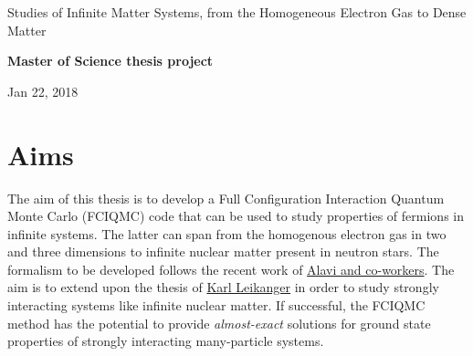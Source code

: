 \documentclass[%
oneside,                 %
final,                   %
10pt]{article}
\begin{document}

\newcommand{\exercisesection}[1]{\subsection*{#1}}






\thispagestyle{empty}

\begin{center}
{\LARGE\bf
\begin{spacing}{1.25}
Studies of Infinite Matter Systems, from the Homogeneous Electron Gas to Dense Matter 
\end{spacing}
}
\end{center}


\begin{center}
{\bf Master of Science thesis project${}^{}$} \\ [0mm]
\end{center}

\begin{center}
\end{center}
    

\begin{center}
Jan 22, 2018
\end{center}

\vspace{1cm}


\section*{Aims}

The aim of this thesis is to develop a Full Configuration Interaction Quantum Monte Carlo (FCIQMC)
code that can be used to study properties of fermions in infinite systems. The latter can span from 
the homogenous electron gas in two and three dimensions to infinite nuclear matter present in neutron stars. 
The formalism to be developed follows the recent work of \href{{http://www.nature.com/nature/journal/v493/n7432/full/nature11770.html}}{Alavi and co-workers}. The aim is to extend upon the thesis of \href{{https://www.duo.uio.no/handle/10852/37172}}{Karl Leikanger} in order to study strongly interacting systems like infinite nuclear matter.  If successful, the FCIQMC method has the potential to provide \emph{almost-exact} solutions for ground state properties of strongly interacting many-particle systems. 
\end{document}
